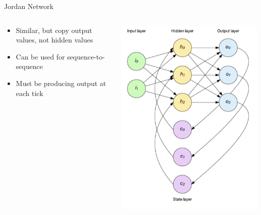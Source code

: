\documentclass[aspectratio=169]{beamer}
\begin{document}
\begin{frame}{Jordan Network}

\begin{columns}
\begin{column}{0.6\textwidth}
\begin{itemize} 
	\item Similar, but copy output values, not hidden values
	\item Can be used for sequence-to-sequence
	\item Must be producing output at each tick
\end{itemize}
\end{column}
\begin{column}{0.4\textwidth}
\includegraphics[width=1\textwidth]{lectRNN/Jordan.png}
\end{column}
\end{columns}
\end{frame}
\end{document}

